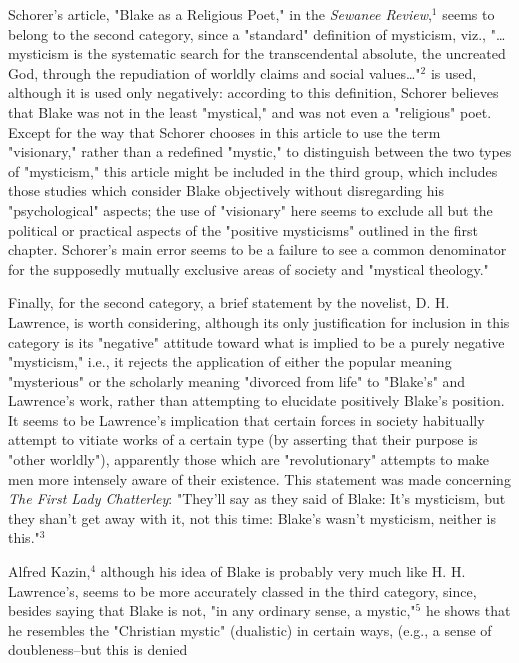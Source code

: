 Schorer's article, "Blake as a Religious Poet," in the \textit{Sewanee Review},$^{1}$ seems to belong to the second category,
since a "standard" definition of mysticism, viz., "\dots mysticism is the systematic search for
the transcendental absolute, the uncreated God, through the repudiation of worldly claims and 
social values\dots"$^{2}$ is used, although it is used only negatively: according to this definition, Schorer
believes that Blake was not in the least "mystical," and was not even a "religious" poet. Except for the way that Schorer chooses
in this article to use the term "visionary," rather than a redefined "mystic," to distinguish between the two types of 
"mysticism," this article might be included in the third group, which includes those studies which consider Blake objectively
without disregarding his "psychological" aspects; the use of "visionary" here seems to exclude all but the political or
practical aspects of the "positive mysticisms" outlined in the first chapter. Schorer's main error seems to be a failure
to see a common denominator for the supposedly mutually exclusive areas of society and "mystical theology."\par
\vspace*{0.5\baselineskip}
Finally, for the second category, a brief statement by the novelist, D. H. Lawrence, is worth
considering, although its only justification for inclusion in this category is its "negative" attitude toward what is
implied to be a purely negative "mysticism," i.e., it rejects the application of either the popular meaning "mysterious" or the
scholarly meaning "divorced from life" to "Blake's" and Lawrence's work, rather
than attempting to elucidate positively Blake's position. It seems to be Lawrence's implication that certain 
forces in society habitually attempt to vitiate works of a certain type (by asserting that their purpose is "other worldly"), apparently
those which are "revolutionary" attempts to make men more intensely aware of their existence. This statement was made concerning
\textit{The First Lady Chatterley}: "They'll say as they said of Blake: It's mysticism, but they shan't get away with it, not this time: Blake's
wasn't mysticism, neither is this."$^{3}$\par
\vspace*{0.5\baselineskip}
Alfred Kazin,$^{4}$ although his idea of Blake is probably very much like H. H. Lawrence's, seems to be more accurately
classed in the third category, since, besides saying that Blake is not, "in any ordinary sense, a mystic,"$^{5}$ he shows
that he resembles the "Christian mystic" (dualistic) in certain ways, (e.g., a sense of doubleness--but this is denied
